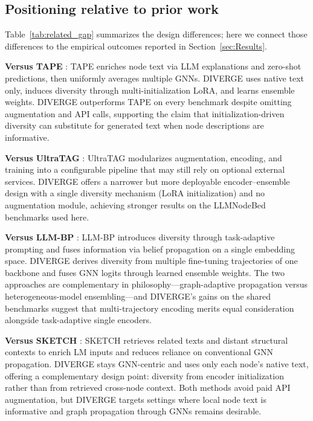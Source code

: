 \documentclass[a4paper,fleqn]{cas-sc}
\begin{document}
\subsection{Positioning relative to prior work}

Table~\ref{tab:related_gap} summarizes the design differences; here we connect those differences to the empirical outcomes reported in Section~\ref{sec:Results}.

\textbf{Versus TAPE} \citep{he2024harnessing}: TAPE enriches node text via LLM explanations and zero-shot predictions, then uniformly averages multiple GNNs. DIVERGE uses native text only, induces diversity through multi-initialization LoRA, and learns ensemble weights. DIVERGE outperforms TAPE on every benchmark despite omitting augmentation and API calls, supporting the claim that initialization-driven diversity can substitute for generated text when node descriptions are informative.


\textbf{Versus UltraTAG} \citep{yu2025ultratag}: UltraTAG modularizes augmentation, encoding, and training into a configurable pipeline that may still rely on optional external services. DIVERGE offers a narrower but more deployable encoder--ensemble design with a single diversity mechanism (LoRA initialization) and no augmentation module, achieving stronger results on the LLMNodeBed benchmarks used here.

\textbf{Versus LLM-BP} \citep{wang2025llmbp}: LLM-BP introduces diversity through task-adaptive prompting and fuses information via belief propagation on a single embedding space. DIVERGE derives diversity from multiple fine-tuning trajectories of one backbone and fuses GNN logits through learned ensemble weights. The two approaches are complementary in philosophy---graph-adaptive propagation versus heterogeneous-model ensembling---and DIVERGE's gains on the shared benchmarks suggest that multi-trajectory encoding merits equal consideration alongside task-adaptive single encoders.

\textbf{Versus SKETCH} \citep{zhou-etal-2025sketch}: SKETCH retrieves related texts and distant structural contexts to enrich LM inputs and reduces reliance on conventional GNN propagation. DIVERGE stays GNN-centric and uses only each node's native text, offering a complementary design point: diversity from encoder initialization rather than from retrieved cross-node context. Both methods avoid paid API augmentation, but DIVERGE targets settings where local node text is informative and graph propagation through GNNs remains desirable.
\end{document}
